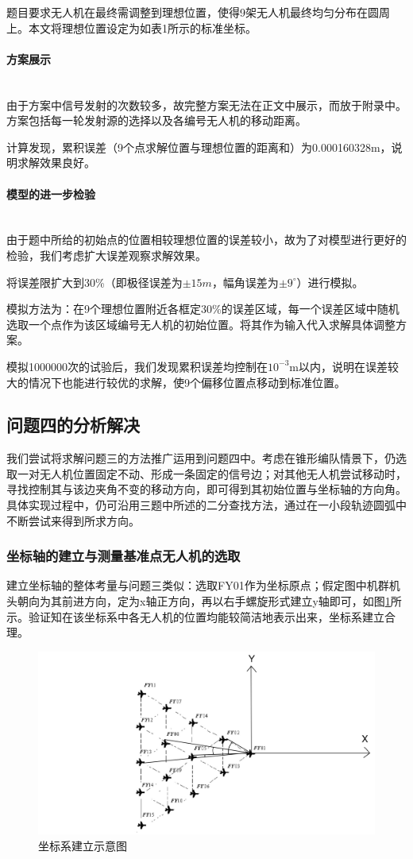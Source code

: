 \documentclass{ctexart}
\newcommand{\subsubsubsection}[1]{\paragraph{#1}\mbox{}\\}
\begin{document}
题目要求无人机在最终需调整到理想位置，使得9架无人机最终均匀分布在圆周上。本文将理想位置设定为如表1所示的标准坐标。
\subsubsubsection{方案展示}
由于方案中信号发射的次数较多，故完整方案无法在正文中展示，而放于附录中。方案包括每一轮发射源的选择以及各编号无人机的移动距离。

计算发现，累积误差（9个点求解位置与理想位置的距离和）为0.000160328m，说明求解效果良好。

\subsubsubsection{模型的进一步检验}
由于题中所给的初始点的位置相较理想位置的误差较小，故为了对模型进行更好的检验，我们考虑扩大误差观察求解效果。

将误差限扩大到30\%（即极径误差为$\pm 15m $，幅角误差为$\pm 9^{\circ}$）进行模拟。

模拟方法为：在9个理想位置附近各框定30\%的误差区域，每一个误差区域中随机选取一个点作为该区域编号无人机的初始位置。将其作为输入代入求解具体调整方案。

模拟1000000次的试验后，我们发现累积误差均控制在$10^{-3}$m以内，说明在误差较大的情况下也能进行较优的求解，使9个偏移位置点移动到标准位置。

\subsection{问题四的分析解决}
我们尝试将求解问题三的方法推广运用到问题四中。考虑在锥形编队情景下，仍选取一对无人机位置固定不动、形成一条固定的信号边；对其他无人机尝试移动时，寻找控制其与该边夹角不变的移动方向，即可得到其初始位置与坐标轴的方向角。具体实现过程中，仍可沿用三题中所述的二分查找方法，通过在一小段轨迹圆弧中不断尝试来得到所求方向。

\subsubsection{坐标轴的建立与测量基准点无人机的选取} 

建立坐标轴的整体考量与问题三类似：选取FY01作为坐标原点；假定图中机群机头朝向为其前进方向，定为x轴正方向，再以右手螺旋形式建立y轴即可，如图\ref{坐标系建立示意图}所示。验证知在该坐标系中各无人机的位置均能较简洁地表示出来，坐标系建立合理。

\begin{figure}[H]
  \centering
  \includegraphics[width=0.45\linewidth]{pic/share.jpg}
  \caption{坐标系建立示意图}
  \label{坐标系建立示意图}
  \end{figure}
\end{document}
